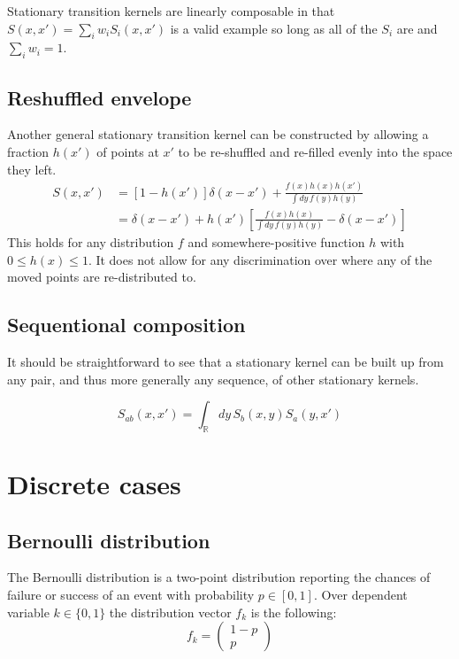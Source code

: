 \documentclass{article}
\newcommand{\intR}{\int_{\mathbb{R}}}
\begin{document}
Stationary transition kernels are linearly composable in that $S(x, x') = \sum_i w_i S_i(x, x')
$ is a valid example so long as all of the $S_i$ are and $\sum_i w_i = 1$.

\subsection{Reshuffled envelope}
Another general stationary transition kernel can be constructed by allowing a
fraction $h(x')$ of points at $x'$ to be re-shuffled and re-filled evenly into
the space they left.
\begin{align}
	S(x, x') & = [1-h(x')]\delta(x-x') + \frac{f(x) h(x) h(x')}{\int dy\,f(y) h(y)}                      \\
	         & = \delta(x-x') + h(x') \left[ \frac{f(x) h(x)}{\int dy\,f(y) h(y)} - \delta(x-x') \right]
\end{align}
This holds for any distribution $f$ and somewhere-positive function $h$ with $0
	\leq h(x) \leq 1$. It does not allow for any discrimination over where any of
the moved points are re-distributed to.

\subsection{Sequentional composition}

It should be straightforward to see that a stationary kernel can be built up
from any pair, and thus more generally any sequence, of other stationary
kernels.

\begin{equation}
	S_{ab}(x, x') = \intR dy\, S_b(x, y) S_a(y, x')
\end{equation}

\section{Discrete cases}

\subsection{Bernoulli distribution}

The Bernoulli distribution is a two-point distribution reporting the chances of
failure or success of an event with probability $p \in [0, 1]$. Over dependent variable $k
\in \{0, 1\}$ the distribution vector $f_k$ is the following:
\begin{equation}
  f_k = \begin{pmatrix} 1-p \\ p \end{pmatrix}
  \label{eq:bernoulli_dist}
\end{equation}
\end{document}
